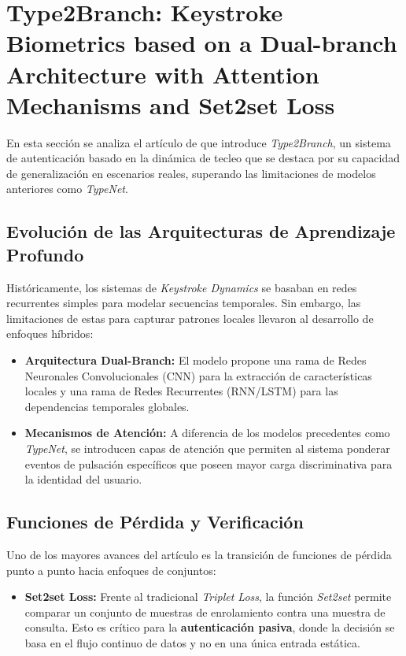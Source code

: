 \section{Type2Branch: Keystroke Biometrics based on a Dual-branch Architecture
with Attention Mechanisms and Set2set Loss}

En esta sección se analiza el artículo de \cite{type2branch} que introduce \textit{Type2Branch}, un sistema de autenticación basado en la dinámica de tecleo que se destaca por su capacidad de generalización en escenarios reales, superando las limitaciones de modelos anteriores como \textit{TypeNet}.

\subsection{Evolución de las Arquitecturas de Aprendizaje Profundo}
Históricamente, los sistemas de \textit{Keystroke Dynamics} se basaban en redes recurrentes simples para modelar secuencias temporales. Sin embargo, las limitaciones de estas para capturar patrones locales llevaron al desarrollo de enfoques híbridos:

\begin{itemize}
    \item \textbf{Arquitectura Dual-Branch:} El modelo propone una rama de Redes Neuronales Convolucionales (CNN) para la extracción de características locales y una rama de Redes Recurrentes (RNN/LSTM) para las dependencias temporales globales.
    \item \textbf{Mecanismos de Atención:} A diferencia de los modelos precedentes como \textit{TypeNet}, se introducen capas de atención que permiten al sistema ponderar eventos de pulsación específicos que poseen mayor carga discriminativa para la identidad del usuario.
\end{itemize}

\subsection{Funciones de Pérdida y Verificación}
Uno de los mayores avances del artículo es la transición de funciones de pérdida punto a punto hacia enfoques de conjuntos:

\begin{itemize}
    \item \textbf{Set2set Loss:} Frente al tradicional \textit{Triplet Loss}, la función \textit{Set2set} permite comparar un conjunto de muestras de enrolamiento contra una muestra de consulta. Esto es crítico para la \textbf{autenticación pasiva}, donde la decisión se basa en el flujo continuo de datos y no en una única entrada estática.
\end{itemize}

